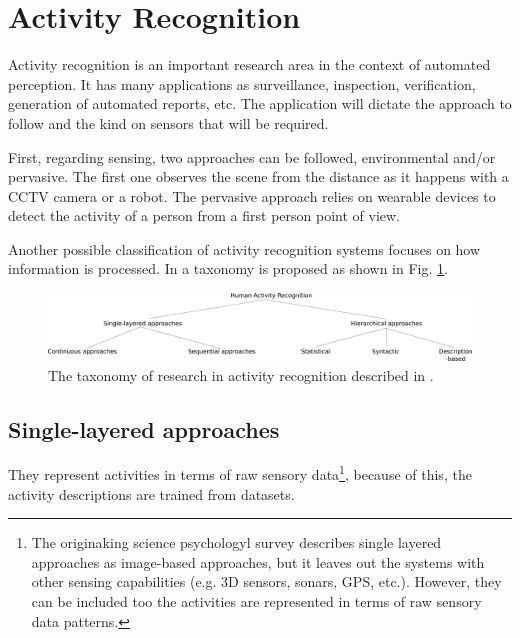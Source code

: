 \documentclass[a4paper, 12pt, openany, oneside]{book}
\begin{document}



\section{Activity Recognition} 

Activity recognition is an important research area in the context of automated perception. 
It has many applications as surveillance, inspection, verification, generation of automated reports, etc.
The application will dictate the approach to follow and the kind on sensors that will be required.

First, regarding sensing, two approaches can be followed, environmental and/or pervasive. 
The first one observes the scene from the distance as it happens with a CCTV camera or a robot. 
The pervasive approach relies on wearable devices to detect the activity of a person from a first person point of view.

Another possible classification of activity recognition systems focuses on how information is processed.
In \citep{Aggarwal11_HumanActivity} a taxonomy is proposed as shown in Fig. \ref{fig:taxonomy}.  

\begin{figure}[h]
\centering
\includegraphics[width=\textwidth]{fig/img_Aggarwal_Taxonomy2.pdf}
\caption{The taxonomy of research in activity recognition described in \cite{Aggarwal11_HumanActivity}.}
\label{fig:taxonomy}
\end{figure}

\subsection{Single-layered approaches}
They represent activities in terms of raw sensory data\footnote{The originaking science psychologyl survey \citep{Aggarwal11_HumanActivity} describes single layered approaches as image-based approaches, but it leaves out the systems with other sensing capabilities (e.g. 3D sensors, sonars, GPS, etc.).
However, they can be included too the activities are represented in terms of raw sensory data patterns.}, because of this, the activity descriptions are trained from datasets.
\end{document}
